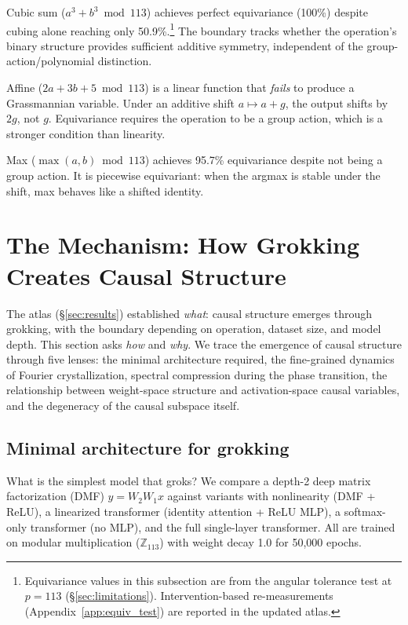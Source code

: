 \documentclass{article}
\newcommand{\Z}{\mathbb{Z}}
\begin{document}
Cubic sum ($a^3 + b^3 \bmod 113$) achieves perfect equivariance (100\%) despite
cubing alone reaching only 50.9\%.\footnote{Equivariance values in this
subsection are from the angular tolerance test at $p{=}113$
(\S\ref{sec:limitations}). Intervention-based re-measurements
(Appendix~\ref{app:equiv_test}) are reported in the updated atlas.}
The boundary tracks whether the operation's binary structure provides sufficient
additive symmetry, independent of the group-action/polynomial distinction.

Affine ($2a + 3b + 5 \bmod 113$) is a linear function that \emph{fails} to
produce a Grassmannian variable. Under an additive shift $a \mapsto a + g$, the
output shifts by $2g$, not $g$. Equivariance requires the operation to be a group
action, which is a stronger condition than linearity.

Max ($\max(a,b) \bmod 113$) achieves 95.7\% equivariance despite not being a
group action. It is piecewise equivariant: when the argmax is stable under the
shift, max behaves like a shifted identity.


\section{The Mechanism: How Grokking Creates Causal Structure}
\label{sec:mechanism}

The atlas (\S\ref{sec:results}) established \emph{what}: causal structure
emerges through grokking, with the boundary depending on operation, dataset
size, and model depth. This section asks \emph{how} and \emph{why}.
We trace the emergence of causal structure through five lenses: the minimal
architecture required, the fine-grained dynamics of Fourier crystallization,
spectral compression during the phase transition, the relationship between
weight-space structure and activation-space causal variables, and the
degeneracy of the causal subspace itself.

\subsection{Minimal architecture for grokking}
\label{sec:dmf}

What is the simplest model that groks? We compare a depth-2 deep matrix
factorization (DMF) $y = W_2 W_1 x$ against variants with nonlinearity
(DMF + ReLU), a linearized transformer (identity attention + ReLU MLP),
a softmax-only transformer (no MLP), and the full single-layer transformer.
All are trained on modular multiplication ($\Z_{113}$) with weight decay 1.0
for 50{,}000 epochs.
\end{document}
